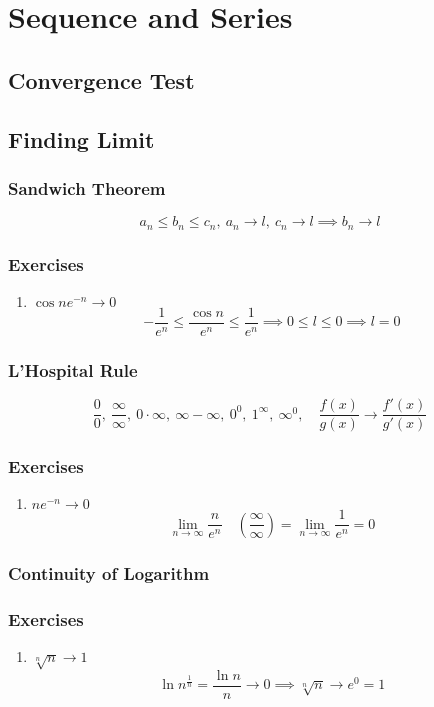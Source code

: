 \chapter{Sequence and Series}
\section{Convergence Test}
\section{Finding Limit}
\subsection{Sandwich Theorem}
$$ a_n \le b_n \le c_n,\ a_n \to l,\ c_n \to l \implies b_n \to l $$

\subsection*{Exercises}
\begin{enumerate}
	\item $\cos n e^{-n} \to 0$
		$$ -\frac{1}{e^n} \le \frac{\cos n}{e^n} \le \frac{1}{e^n} \implies 0 \le l \le 0 \implies l = 0 $$
\end{enumerate}
\subsection{L'Hospital Rule}
 $$ \frac{0}{0},\ \frac{\infty}{\infty},\ 0\cdot\infty,\ \infty-\infty,\ 0^0,\ 1^\infty,\ \infty^0,\quad \frac{f(x)}{g(x)} \to \frac{f'(x)}{g'(x)} $$
\subsection*{Exercises}
\begin{enumerate}
	\item $ne^{-n} \to 0$  
		$$ \lim_{n \to \infty} \frac{n}{e^n} \quad \left(\frac{\infty}{\infty}\right)= \lim_{n \to \infty} \frac{1}{e^n} = 0 $$
\end{enumerate}

\subsection{Continuity of Logarithm}

\subsection*{Exercises}
\begin{enumerate}
	\item $\sqrt[n]{n} \to 1$
		$$ \ln n^\frac{1}{n} = \frac{\ln n}{n} \to 0 \implies \sqrt[n]{n} \to e^0 = 1 $$
\end{enumerate}

